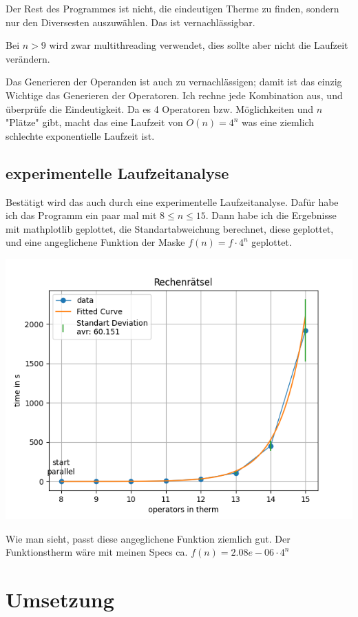 \documentclass[a4paper,10pt,ngerman]{scrartcl}
\begin{document}
Der Rest des Programmes ist nicht, die eindeutigen Therme zu finden, sondern nur den Diversesten auszuwählen. Das ist vernachlässigbar.

Bei $n > 9$ wird zwar multithreading verwendet, dies sollte aber nicht die Laufzeit verändern.

Das Generieren der Operanden ist auch zu vernachlässigen; damit ist das einzig Wichtige das Generieren der Operatoren. Ich rechne jede Kombination aus, und überprüfe die Eindeutigkeit. Da es 4 Operatoren bzw. Möglichkeiten und $n$ "Plätze" gibt, macht das eine Laufzeit von $O(n) = 4^n$ was eine ziemlich schlechte exponentielle Laufzeit ist.

\subsection{experimentelle Laufzeitanalyse}

Bestätigt wird das auch durch eine experimentelle Laufzeitanalyse. Dafür habe ich das Programm ein paar mal mit $8 \leq n \leq 15$. Dann habe ich die Ergebnisse mit mathplotlib geplottet, die Standartabweichung berechnet, diese geplottet, und eine angeglichene Funktion der Maske $f(n) = f \cdot 4^n$ geplottet.

\includegraphics[width=\textwidth]{Laufzeit.png}

Wie man sieht, passt diese angeglichene Funktion ziemlich gut. Der Funktionstherm wäre mit meinen Specs ca. $f(n) = 2.08e-06 \cdot 4^n$





\section{Umsetzung}
\end{document}
